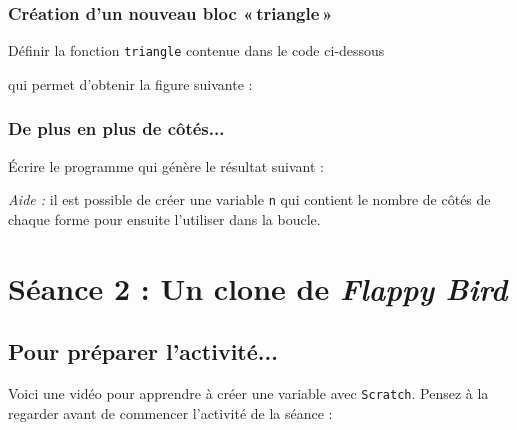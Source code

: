 \subsubsection{Création d'un nouveau bloc «\,triangle\,»}

Définir la fonction \texttt{triangle} contenue dans le code ci-dessous 


qui permet d'obtenir la figure suivante :






\subsubsection{De plus en plus de côtés...}

Écrire le programme qui génère le résultat suivant :


\emph{Aide :} il est possible de créer une variable \texttt{n} qui contient le nombre de côtés de chaque forme pour ensuite l'utiliser dans la boucle.


\newpage 

%
%
%
%




\section{Séance 2 : Un clone de \emph{Flappy Bird}}\label{ficheScratch4e2}

\subsection{Pour préparer l'activité...}

\vspace{10pt}

Voici une vidéo pour apprendre à créer une variable avec \texttt{Scratch}. Pensez à la regarder avant de commencer l'activité de la séance :

\begin{center}
\end{center}

